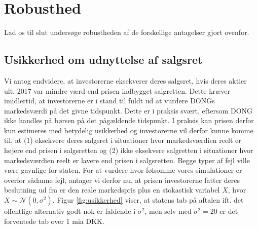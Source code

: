 \documentclass{article}
\begin{document}
\section{Robusthed}
\label{sec:antag}
Lad os til slut undersøge robustheden af de forskellige antagelser gjort ovenfor. 


\subsection{Usikkerhed om udnyttelse af salgsret}

 Vi antog endvidere, at investorerne eksekverer deres salgsret, hvis deres aktier ult. 2017 var mindre værd end prisen indbygget salgretten. Dette kræver imidlertid, at investorerne er i stand til fuldt ud at vurdere DONGs markedsværdi på det givne tidspunkt. Dette er i praksis svært, eftersom DONG ikke handles på børsen på det pågældende tidspunkt. I praksis kan prisen derfor kun estimeres med betydelig usikkerhed og  investorerne vil derfor kunne komme til, at (1) eksekvere deres salgsret i situationer hvor markedsværdien reelt er højere end prisen i salgsretten og (2) ikke eksekvere salgretten i situationer hvor markedsværdien reelt er lavere end prisen i salgsretten. Begge typer af fejl ville være gavnlige for staten. For at vurdere hvor følsomme vores simulationer er overfor sådanne fejl, antager vi derfor nu, at prisen investorerne fatter deres beslutning ud fra er den reale markedspris plus en stokastisk variabel $X$, hvor $X \sim \mathcal{N}(0, \sigma^2)$. Figur \ref{fig:usikkerhed} viser, at statens tab på aftalen ift. det offentlige alternativ godt nok er faldende i $\sigma^2$, men selv med $\sigma^2=20$ er det forventede tab over 1 mia DKK.%
 
\end{document}

